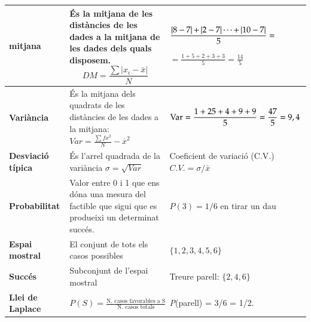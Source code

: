 \begin{center}
\begin{longtable}{|p{}|p{}|p{}|}
\cellcolor{lightgray} \textbf{mitjana} & És la mitjana de les distàncies de les dades a la mitjana de les dades dels quals disposem.\newline \[DM = \frac{\sum |x_i - \bar x|}{N} \]  & 

 $\frac{\left|{\rm 8- 7}\right|{\rm +}  \left|{\rm 2- 7}\right| \cdots  {\rm +}\left|{\rm 10- 7}\right|}{{\rm 5}} = $  

$=\frac{1+5+2+3+3}{5} =\frac{14}{5}$\\ \hline 
\cellcolor{lightgray} \textbf{Variància} & És la mitjana dels quadrats de les distàncies de les dades a la mitjana: $Var=\frac{\sum{fx^2}}{N}-{\overline{x}}^2$ & ${\rm Var}=\frac{{\rm 1}+2{\rm 5}+{\rm 4}+{\rm 9}+{\rm 9}}{5} =\frac{47}{5} ={\rm 9},{\rm 4}$ \\ \hline 
\cellcolor{lightgray} \textbf{Desviació típica} & És l'arrel quadrada de la variància  $\sigma =\sqrt{Var}$ & Coeficient de variació (C.V.) $C.V. = \sigma / \bar x$  \\ \hline 
\cellcolor{lightgray} \textbf{Probabilitat} & Valor entre 0 i 1 que ens dóna una mesura del factible que sigui que es produeixi un determinat succés.  & $P(3) = 1/6$ en tirar un dau \\ \hline 
\cellcolor{lightgray} \textbf{Espai mostral} & El conjunt de tots els casos possibles  & $\{ 1, 2, 3, 4, 5, 6 \}$ \\ \hline 
\cellcolor{lightgray} \textbf{Succés} & Subconjunt de l'espai mostral & Treure parell: $\{ 2, 4, 6 \}$ \\ \hline 
\cellcolor{lightgray} \textbf{Llei de Laplace} & $P(S)=\frac{\text{N. casos favorables a S}}{\text{N. casos totals}} $ & \textit{P}(parell) = 3/6 = 1/2. \\ \hline 
\end{longtable}

\end{center}


 




